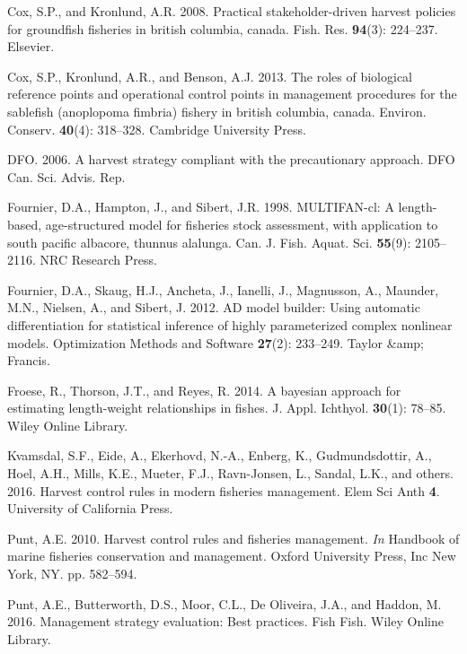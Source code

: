 \documentclass[12pt,]{article}
\begin{document}
\hypertarget{ref-cox2008practical}{}
Cox, S.P., and Kronlund, A.R. 2008. Practical stakeholder-driven harvest
policies for groundfish fisheries in british columbia, canada. Fish.
Res. \textbf{94}(3): 224--237. Elsevier.

\hypertarget{ref-cox2013roles}{}
Cox, S.P., Kronlund, A.R., and Benson, A.J. 2013. The roles of
biological reference points and operational control points in management
procedures for the sablefish (anoplopoma fimbria) fishery in british
columbia, canada. Environ. Conserv. \textbf{40}(4): 318--328. Cambridge
University Press.

\hypertarget{ref-DFO2006A-Harvest-Strat}{}
DFO. 2006. A harvest strategy compliant with the precautionary approach.
DFO Can. Sci. Advis. Rep.

\hypertarget{ref-fournier1998multifan}{}
Fournier, D.A., Hampton, J., and Sibert, J.R. 1998. MULTIFAN-cl: A
length-based, age-structured model for fisheries stock assessment, with
application to south pacific albacore, thunnus alalunga. Can. J. Fish.
Aquat. Sci. \textbf{55}(9): 2105--2116. NRC Research Press.

\hypertarget{ref-fournier2012ad}{}
Fournier, D.A., Skaug, H.J., Ancheta, J., Ianelli, J., Magnusson, A.,
Maunder, M.N., Nielsen, A., and Sibert, J. 2012. AD model builder: Using
automatic differentiation for statistical inference of highly
parameterized complex nonlinear models. Optimization Methods and
Software \textbf{27}(2): 233--249. Taylor \&amp; Francis.

\hypertarget{ref-froese2014bayesian}{}
Froese, R., Thorson, J.T., and Reyes, R. 2014. A bayesian approach for
estimating length-weight relationships in fishes. J. Appl. Ichthyol.
\textbf{30}(1): 78--85. Wiley Online Library.

\hypertarget{ref-kvamsdal2016harvest}{}
Kvamsdal, S.F., Eide, A., Ekerhovd, N.-A., Enberg, K., Gudmundsdottir,
A., Hoel, A.H., Mills, K.E., Mueter, F.J., Ravn-Jonsen, L., Sandal,
L.K., and others. 2016. Harvest control rules in modern fisheries
management. Elem Sci Anth \textbf{4}. University of California Press.

\hypertarget{ref-punt2010harvest}{}
Punt, A.E. 2010. Harvest control rules and fisheries management.
\emph{In} Handbook of marine fisheries conservation and management.
Oxford University Press, Inc New York, NY. pp. 582--594.

\hypertarget{ref-punt2016management}{}
Punt, A.E., Butterworth, D.S., Moor, C.L., De Oliveira, J.A., and
Haddon, M. 2016. Management strategy evaluation: Best practices. Fish
Fish. Wiley Online Library.
\end{document}
